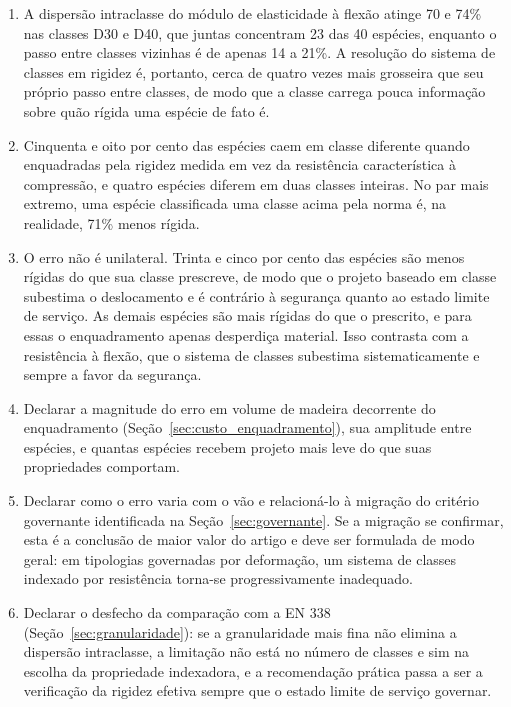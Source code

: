 \begin{enumerate}[nosep]

\item A dispersão intraclasse do módulo de elasticidade à flexão atinge 70 e 74\% nas classes D30 e D40, que juntas concentram 23 das 40 espécies, enquanto o passo entre classes vizinhas é de apenas 14 a 21\%. A resolução do sistema de classes em rigidez é, portanto, cerca de quatro vezes mais grosseira que seu próprio passo entre classes, de modo que a classe carrega pouca informação sobre quão rígida uma espécie de fato é.

\item Cinquenta e oito por cento das espécies caem em classe diferente quando enquadradas pela rigidez medida em vez da resistência característica à compressão, e quatro espécies diferem em duas classes inteiras. No par mais extremo, uma espécie classificada uma classe acima pela norma é, na realidade, 71\% menos rígida.

\item O erro não é unilateral. Trinta e cinco por cento das espécies são menos rígidas do que sua classe prescreve, de modo que o projeto baseado em classe subestima o deslocamento e é contrário à segurança quanto ao estado limite de serviço. As demais espécies são mais rígidas do que o prescrito, e para essas o enquadramento apenas desperdiça material. Isso contrasta com a resistência à flexão, que o sistema de classes subestima sistematicamente e sempre a favor da segurança.

\item {} Declarar a magnitude do erro em volume de madeira decorrente do enquadramento (Seção~\ref{sec:custo_enquadramento}), sua amplitude entre espécies, e quantas espécies recebem projeto mais leve do que suas propriedades comportam.

\item {} Declarar como o erro varia com o vão e relacioná-lo à migração do critério governante identificada na Seção~\ref{sec:governante}. Se a migração se confirmar, esta é a conclusão de maior valor do artigo e deve ser formulada de modo geral: em tipologias governadas por deformação, um sistema de classes indexado por resistência torna-se progressivamente inadequado.

\item {} Declarar o desfecho da comparação com a EN 338 (Seção~\ref{sec:granularidade}): se a granularidade mais fina não elimina a dispersão intraclasse, a limitação não está no número de classes e sim na escolha da propriedade indexadora, e a recomendação prática passa a ser a verificação da rigidez efetiva sempre que o estado limite de serviço governar.

\end{enumerate}

